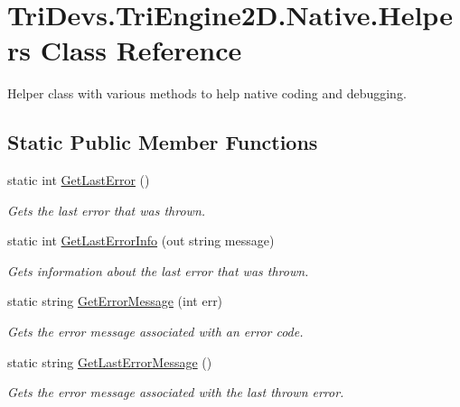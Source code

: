 \hypertarget{class_tri_devs_1_1_tri_engine2_d_1_1_native_1_1_helpers}{\section{Tri\-Devs.\-Tri\-Engine2\-D.\-Native.\-Helpers Class Reference}
\label{class_tri_devs_1_1_tri_engine2_d_1_1_native_1_1_helpers}
}


Helper class with various methods to help native coding and debugging.  


\subsection*{Static Public Member Functions}
\begin{DoxyCompactItemize}
\item 
static int \hyperlink{class_tri_devs_1_1_tri_engine2_d_1_1_native_1_1_helpers_a91706a8e469b4b4cbaa01e7deded9b72}{Get\-Last\-Error} ()
\begin{DoxyCompactList}\small\item\em Gets the last error that was thrown. \end{DoxyCompactList}\item 
static int \hyperlink{class_tri_devs_1_1_tri_engine2_d_1_1_native_1_1_helpers_a85c747f60d22fab009a581c5af083638}{Get\-Last\-Error\-Info} (out string message)
\begin{DoxyCompactList}\small\item\em Gets information about the last error that was thrown. \end{DoxyCompactList}\item 
static string \hyperlink{class_tri_devs_1_1_tri_engine2_d_1_1_native_1_1_helpers_a5b17c6604e5b4437cf7f43c9b36bbeb0}{Get\-Error\-Message} (int err)
\begin{DoxyCompactList}\small\item\em Gets the error message associated with an error code. \end{DoxyCompactList}\item 
static string \hyperlink{class_tri_devs_1_1_tri_engine2_d_1_1_native_1_1_helpers_acf353d2b5a36feb5ded89f1df052b1e9}{Get\-Last\-Error\-Message} ()
\begin{DoxyCompactList}\small\item\em Gets the error message associated with the last thrown error. \end{DoxyCompactList}\item 

\end{DoxyCompactItemize}
